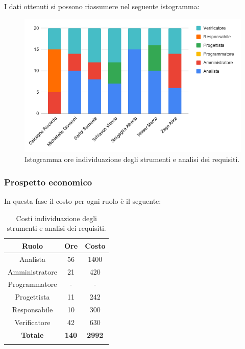 I dati ottenuti si possono riassumere nel seguente istogramma:
\begin{figure}[H]
	\centering
	\includegraphics[width=0.8\linewidth]{./res/images/OreStrumentiRequisiti.png}
	\caption{Istogramma ore individuazione degli strumenti e analisi dei requisiti.}
	\label{fig: Istogramma ore individuazione degli strumenti e analisi dei requisiti.}
\end{figure}

\subsubsection{Prospetto economico}

In questa fase il costo per ogni ruolo è il seguente:
\begin{longtable}{|c|c|c|}
	\hline
	\rowcolor[HTML]{F9CB9C} 
	\textbf{Ruolo} & \textbf{Ore} & \textbf{Costo} \\
	\hline
	Analista & 
	56 & 
	1400 \\
	\hline
	Amministratore & 
	21 & 
	420 \\
	\hline
	Programmatore & 
	- & 
	- \\
	\hline
	Progettista & 
	11 & 
	242 \\
	\hline
	Responsabile & 
	10 & 
	300 \\
	\hline
	Verificatore & 
	42 & 
	630 \\
	\hline
	\rowcolor[HTML]{F9CB9C} 
	\textbf{Totale} & \textbf{140} & \textbf{2992} \\
	\hline
	\caption{Costi individuazione degli strumenti e analisi dei requisiti.}
	\label{fig: Costi individuazione degli strumenti e analisi dei requisiti.}
\end{longtable}

